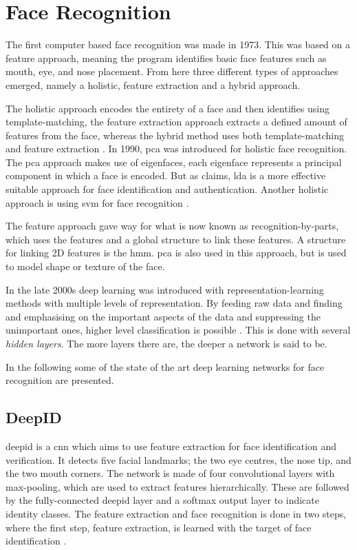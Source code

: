 \section{Face Recognition}
The first computer based face recognition was made in 1973. This was based on a feature approach, meaning the program identifies basic face features such as mouth, eye, and nose placement. 
From here three different types of approaches emerged, namely a holistic, feature extraction and a hybrid approach. 

The holistic approach encodes the entirety of a face and then identifies using template-matching, the feature extraction approach extracts a defined amount of features from the face, whereas the hybrid method uses both template-matching and feature extraction \citep{Wechsler2007}.
In 1990, \gls{pca} was introduced for holistic face recognition. The \gls{pca} approach makes use of eigenfaces, each eigenface represents a principal component in which a face is encoded. But as \cite{Wechsler2007} claims, \gls{lda} is a more effective suitable approach for face identification and authentication. Another holistic approach is using \gls{svm} for face recognition \citep{Wechsler2007}.

The feature approach gave way for what is now known as recognition-by-parts, which uses the features and a global structure to link these features. A structure for linking 2D features is the \gls{hmm}. \gls{pca} is also used in this approach, but is used to model shape or texture of the face.

In the late 2000s deep learning was introduced with representation-learning methods with multiple levels of representation. By feeding raw data and finding and emphasising on the important aspects of the data and suppressing the unimportant ones, higher level classification is possible \citep{LeCun2015}. This is done with several \textit{hidden layers}. The more layers there are, the deeper a network is said to be. 

In the following some of the state of the art deep learning networks for face recognition are presented.

\subsection{DeepID}
\gls{deepid} is a \gls{cnn} which aims to use feature extraction for face identification and verification. It detects five facial landmarks; the two eye centres, the nose tip, and the two mouth corners. The network is made of four convolutional layers with max-pooling, which are used to extract features hierarchically. These are followed by the fully-connected \gls{deepid} layer and a softmax output layer to indicate identity classes. The feature extraction and face recognition is done in two steps, where the first step, feature extraction, is learned with the target of face identification \citep{deepID2014}.

